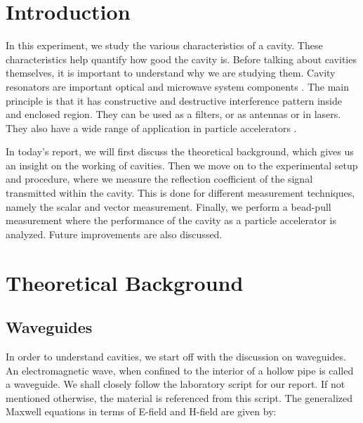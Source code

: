\documentclass[a4paper]{report}
\numberwithin{equation}{section}
\begin{document}
\tableofcontents

\chapter{Introduction}
In this experiment, we study the various characteristics of a cavity. 
These characteristics help quantify how good the cavity is. 
Before talking about cavities themselves, it is important to understand why we are studying them.
 Cavity resonators are important optical and microwave system components \cite{Weng}. 
 The main principle is that it has constructive and destructive interference pattern inside and enclosed region. 
 They can be used as a filters, or as antennas or in lasers. 
They also have a wide range of application in particle accelerators \cite{accelerator}. \par 
In today's report, we will first discuss the theoretical background, 
which gives us an insight on the working of cavities. 
Then we move on to the experimental setup and procedure, where we measure the reflection coefficient
of the signal transmitted within the cavity. This is done for different measurement techniques, namely the 
scalar and vector measurement. Finally, we perform a bead-pull
measurement where the performance of the cavity as a particle accelerator is analyzed. Future improvements are also discussed.

\chapter{Theoretical Background}

\section{Waveguides}
In order to understand cavities, we start off with the discussion on waveguides.
An electromagnetic wave, when confined to the interior of a hollow pipe is
called a waveguide. We shall closely follow the laboratory script \cite{Hillert} for our report. If not mentioned
otherwise, the material is referenced from this script. The
generalized Maxwell equations in terms of E-field and H-field are given by:

\end{document}
